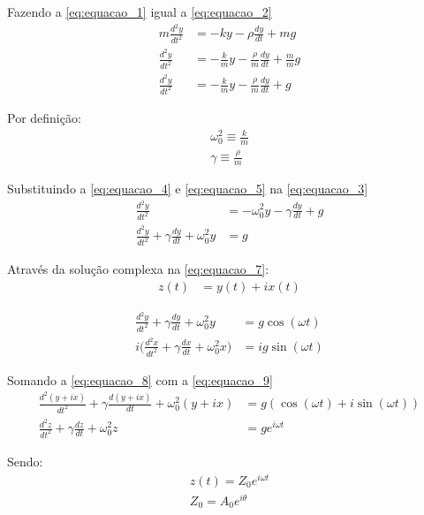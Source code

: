 \documentclass[12pt]{article}
\begin{document}
		Fazendo a \autoref{eq:equacao_1} igual a \autoref{eq:equacao_2}
		\begin{align}
			m\frac{d^2y}{dt^2} &= -ky -\rho\frac{dy}{dt} + mg\nonumber \\
			\frac{d^2y}{dt^2} &= -\frac{k}{m}y -\frac{\rho}{m}\frac{dy}{dt} + \frac{m}{m}g \nonumber \\
			\frac{d^2y}{dt^2} &= -\frac{k}{m}y -\frac{\rho}{m}\frac{dy}{dt} + g \label{eq:equacao_3}
		\end{align}
		
		Por definição:
		\begin{align}
			\omega_0^2 \equiv \frac{k}{m} \label{eq:equacao_4}\\
			\gamma \equiv \frac{\rho}{m} \label{eq:equacao_5}			
		\end{align}
		
		Substituindo a \autoref{eq:equacao_4} e \autoref{eq:equacao_5} na \autoref{eq:equacao_3}
		\begin{align}
			\frac{d^2y}{dt^2} &=-\omega_0^2y -\gamma\frac{dy}{dt} + g\nonumber \\
			\frac{d^2y}{dt^2}+\gamma\frac{dy}{dt}+\omega_0^2y &=g \label{eq:equacao_6}
		\end{align}
		
		Através da solução complexa na \autoref{eq:equacao_7}:
		\begin{align}
			z(t) &= y(t) + i x(t) \label{eq:equacao_7} 
		\end{align}
		
		\begin{align}
			\frac{d^2y}{dt^2}+\gamma\frac{dy}{dt}+\omega_0^2y &=g \cos(\omega t) \label{eq:equacao_8} \\
			i\biggl(\frac{d^2x}{dt^2}+\gamma\frac{dx}{dt}+\omega_0^2x\biggr) &=ig\sin(\omega t) \label{eq:equacao_9}
		\end{align}
		
		Somando a \autoref{eq:equacao_8} com a \autoref{eq:equacao_9}
		\begin{align}
			\frac{d^2(y+ix)}{dt^2}+\gamma\frac{d(y+ix)}{dt}+\omega_0^2(y+ix) &=g (\cos(\omega t)+i\sin(\omega t)) \nonumber \\
			\frac{d^2z}{dt^2}+\gamma\frac{dz}{dt}+\omega_0^2z &=ge^{i\omega t} \label{eq:equacao_10}
		\end{align}
		
		Sendo:
		\begin{align}
			z(t) = Z_0e^{i\omega t} \label{eq:equacao_11} \\
			Z_0 = A_0e^{i\theta} \label{eq:equacao_12}
		\end{align}
		
\end{document}
